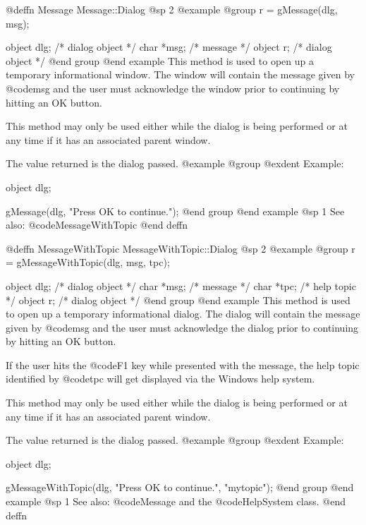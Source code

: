 @deffn {Message} Message::Dialog
@sp 2
@example
@group
r = gMessage(dlg, msg);

object  dlg;    /*  dialog object  */
char    *msg;   /*  message        */
object  r;      /*  dialog object  */
@end group
@end example
This method is used to open up a temporary informational window.  The
window will contain the message given by @code{msg} and the user must
acknowledge the window prior to continuing by hitting an OK button.

This method may only be used either while the dialog is being performed
or at any time if it has an associated parent window.

The value returned is the dialog passed.
@example
@group
@exdent Example:

object  dlg;

gMessage(dlg, "Press OK to continue.");
@end group
@end example
@sp 1
See also:  @code{MessageWithTopic}
@end deffn












@deffn {MessageWithTopic} MessageWithTopic::Dialog
@sp 2
@example
@group
r = gMessageWithTopic(dlg, msg, tpc);

object  dlg;    /*  dialog object  */
char    *msg;   /*  message        */
char    *tpc;   /*  help topic     */
object  r;      /*  dialog object  */
@end group
@end example
This method is used to open up a temporary informational dialog.  The
dialog will contain the message given by @code{msg} and the user must
acknowledge the dialog prior to continuing by hitting an OK button.

If the user hits the @code{F1} key while presented with the message,
the help topic identified by @code{tpc} will get displayed via the Windows
help system.

This method may only be used either while the dialog is being performed
or at any time if it has an associated parent window.

The value returned is the dialog passed.
@example
@group
@exdent Example:

object  dlg;

gMessageWithTopic(dlg, "Press OK to continue.", "mytopic");
@end group
@end example
@sp 1
See also:  @code{Message} and the @code{HelpSystem} class.
@end deffn














